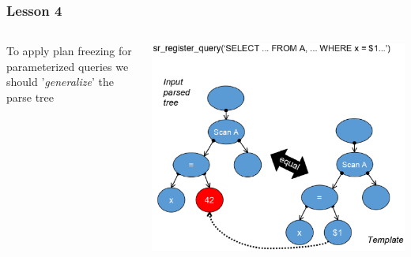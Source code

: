 \documentclass{beamer}
\begin{document}
\begin{frame}[fragile]\frametitle{Lesson 4}
\begin{columns}\begin{column}{0.5\textwidth}
To apply plan freezing for parameterized queries we should '\textit{generalize}' the parse tree
\end{column}\begin{column}{0.5\textwidth}
  \begin{center}
    \includegraphics[scale=0.3]{tree_template}
  \end{center}
\end{column}\end{columns}
\end{frame}
\end{document}
